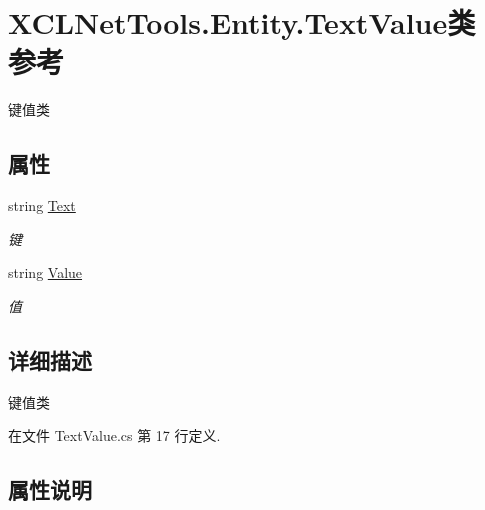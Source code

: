 \hypertarget{class_x_c_l_net_tools_1_1_entity_1_1_text_value}{}\section{X\+C\+L\+Net\+Tools.\+Entity.\+Text\+Value类 参考}
\label{class_x_c_l_net_tools_1_1_entity_1_1_text_value}


键值类  


\subsection*{属性}
\begin{DoxyCompactItemize}
\item 
string \hyperlink{class_x_c_l_net_tools_1_1_entity_1_1_text_value_a56860ac04aa98fbb3e41e5b451d16c4a}{Text}
\begin{DoxyCompactList}\small\item\em 键 \end{DoxyCompactList}\item 
string \hyperlink{class_x_c_l_net_tools_1_1_entity_1_1_text_value_a8a193486b942adc898433bd29db3eff7}{Value}
\begin{DoxyCompactList}\small\item\em 值 \end{DoxyCompactList}\end{DoxyCompactItemize}


\subsection{详细描述}
键值类 



在文件 Text\+Value.\+cs 第 17 行定义.



\subsection{属性说明}
\mbox{\label{class_x_c_l_net_tools_1_1_entity_1_1_text_value_a56860ac04aa98fbb3e41e5b451d16c4a}} 
